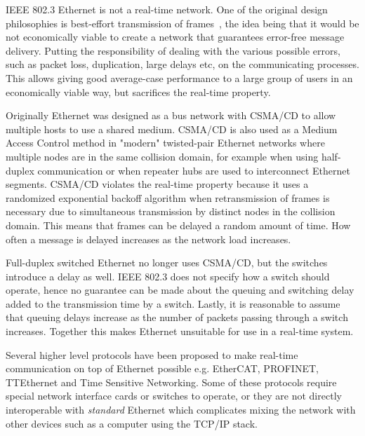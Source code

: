 IEEE 802.3 Ethernet is not a real-time network. One of the original design philosophies is best-effort transmission of frames~\cite{metcalfe1976ethernet}, the idea being that it would be not economically viable to create a network that guarantees error-free message delivery. Putting the responsibility of dealing with the various possible errors, such as packet loss, duplication, large delays etc, on the communicating processes. This allows giving good average-case performance to a large group of users in an economically viable way, but sacrifices the real-time property. 

Originally Ethernet was designed as a bus network with CSMA/CD to allow multiple hosts to use a shared medium. CSMA/CD is also used as a Medium Access Control method in "modern" twisted-pair Ethernet networks where multiple nodes are in the same collision domain, for example when using half-duplex communication or when repeater hubs are used to interconnect Ethernet segments. CSMA/CD violates the real-time property because it uses a randomized exponential backoff algorithm when retransmission of frames is necessary due to simultaneous transmission by distinct nodes in the collision domain. This means that frames can be delayed a random amount of time. How often a message is delayed increases as the network load increases.

Full-duplex switched Ethernet no longer uses CSMA/CD, but the switches introduce a delay as well. IEEE 802.3 does not specify how a switch should operate, hence no guarantee can be made about the queuing and switching delay added to the transmission time by a switch. Lastly, it is reasonable to assume that queuing delays increase as the number of packets passing through a switch increases. Together this makes Ethernet unsuitable for use in a real-time system. 

Several higher level protocols have been proposed to make real-time communication on top of Ethernet possible e.g. EtherCAT, PROFINET, TTEthernet and Time Sensitive Networking. Some of these protocols require special network interface cards or switches to operate, or they are not directly interoperable with \textit{standard} Ethernet which complicates mixing the network with other devices such as a computer using the TCP/IP stack. 

